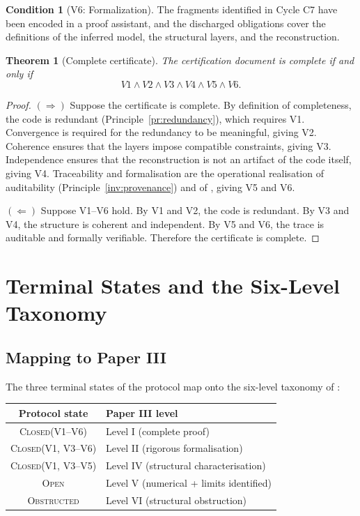 \documentclass[11pt,a4paper]{article}
\theoremstyle{definition}
\newtheorem{condition}[definition]{Condition}
\theoremstyle{plain}
\newtheorem{theorem}[definition]{Theorem}
\newcommand{\STCLOSED}{\textsc{Closed}}
\newcommand{\STOPEN}{\textsc{Open}}
\newcommand{\STOBSTR}{\textsc{Obstructed}}
\begin{document}
\begin{condition}[V6: Formalization]\label{cond:v6}
The fragments identified in Cycle C7 have been encoded in a proof
assistant, and the discharged obligations cover the definitions of
the inferred model, the structural layers, and the reconstruction.
\end{condition}

\begin{theorem}[Complete certificate]\label{th:complete}
The certification document is complete if and only if
\[
  V1 \wedge V2 \wedge V3 \wedge V4 \wedge V5 \wedge V6 .
\]
\end{theorem}

\begin{proof}
$(\Rightarrow)$ Suppose the certificate is complete. By definition
of completeness, the code is redundant (Principle~\ref{pr:redundancy}),
which requires V1. Convergence is required for the redundancy to be
meaningful, giving V2. Coherence ensures that the layers impose
compatible constraints, giving V3. Independence ensures that the
reconstruction is not an artifact of the code itself, giving V4.
Traceability and formalisation are the operational realisation of
auditability (Principle~\ref{inv:provenance}) and of \cite[Level II]{paperIII},
giving V5 and V6.

$(\Leftarrow)$ Suppose V1--V6 hold. By V1 and V2, the code is
redundant. By V3 and V4, the structure is coherent and independent.
By V5 and V6, the trace is auditable and formally verifiable.
Therefore the certificate is complete.
\end{proof}

\section{Terminal States and the Six-Level Taxonomy}
\label{sec:terminal}

\subsection{Mapping to Paper III}

The three terminal states of the protocol map onto the six-level
taxonomy of \cite[\S5]{paperIII}:

\begin{center}
\begin{tabular}{c|l}
  \toprule
  Protocol state & Paper III level \\
  \midrule
  \STCLOSED (V1--V6) & Level I (complete proof) \\
  \STCLOSED (V1, V3--V6) & Level II (rigorous formalisation) \\
  \STCLOSED (V1, V3--V5) & Level IV (structural characterisation) \\
  \STOPEN & Level V (numerical + limits identified) \\
  \STOBSTR & Level VI (structural obstruction) \\
  \bottomrule
\end{tabular}
\end{center}
\end{document}
